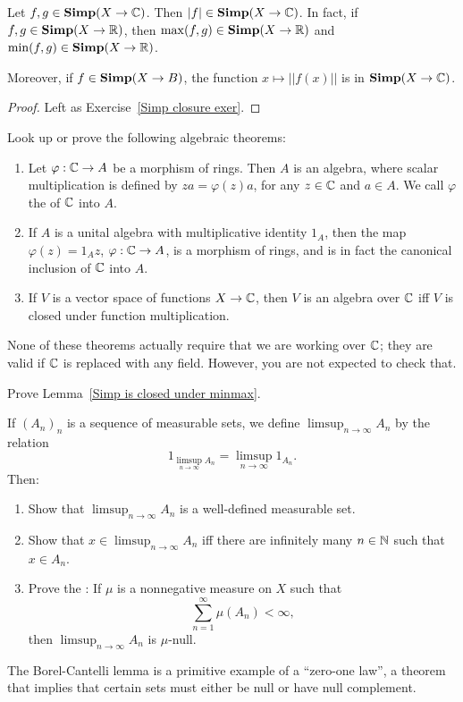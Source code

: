 \begin{lemma}
\label{Simp is closed under minmax}
Let $f, g \in \mathbf{Simp}(X \to \mathbb{C})$. Then $|f| \in \mathbf{Simp}(X \to \mathbb{C})$. In fact, if $f, g \in \mathbf{Simp}(X \to \mathbb{R})$, then $\max(f, g) \in \mathbf{Simp}(X \to \mathbb{R})$ and $\min(f, g) \in \mathbf{Simp}(X \to \mathbb{R})$.

Moreover, if $f \in \mathbf{Simp}(X \to B)$, the function $x \mapsto ||f(x)||$ is in $\mathbf{Simp}(X \to \mathbb{C})$.
\end{lemma}
\begin{proof}
Left as Exercise~\ref{Simp closure exer}.
\end{proof}

\begin{exercise}
\label{algebra review}
Look up or prove the following algebraic theorems:
\begin{enumerate}
\item Let $\varphi: \mathbb{C} \to A$ be a morphism of rings. Then $A$ is an algebra, where scalar multiplication is defined by $za = \varphi(z)a$, for any $z \in \mathbb{C}$ and $a \in A$. We call $\varphi$ the  of $\mathbb{C}$ into $A$.
\item If $A$ is a unital algebra with multiplicative identity $1_A$, then the map $\varphi(z) = 1_Az$, $\varphi: \mathbb{C} \to A$, is a morphism of rings, and is in fact the canonical inclusion of $\mathbb{C}$ into $A$.
\item If $V$ is a vector space of functions $X \to \mathbb{C}$, then $V$ is an algebra over $\mathbb{C}$ iff $V$ is closed under function multiplication.
\end{enumerate}
None of these theorems actually require that we are working over $\mathbb{C}$; they are valid if $\mathbb{C}$ is replaced with any field.
However, you are not expected to check that.
\end{exercise}

\begin{exercise}
\label{Simp closure exer}
Prove Lemma~\ref{Simp is closed under minmax}.
\end{exercise}

\begin{exercise}
\label{Borel-Cantelli}
If $(A_{n})_{n}$ is a sequence of measurable sets, we define $\limsup_{n \to \infty} A_{n}$ by the relation
\[1_{\limsup_{n \to \infty} A_{n}} = \limsup_{n \to \infty} 1_{A_{n}}.\]
Then:
\begin{enumerate}
\item Show that $\limsup_{n \to \infty} A_{n}$ is a well-defined measurable set.
\item Show that $x \in \limsup_{n \to \infty} A_{n}$ iff there are infinitely many $n \in \mathbb{N}$ such that $x \in A_{n}$.
\item Prove the : If $\mu$ is a nonnegative measure on $X$ such that
\[\sum_{n=1}^{\infty} \mu(A_{n}) < \infty,\]
then $\limsup_{n \to \infty} A_{n}$ is $\mu$-null.
\end{enumerate}
The Borel-Cantelli lemma is a primitive example of a ``zero-one law'', a theorem that implies that certain sets must either be null or have null complement.
\end{exercise}

